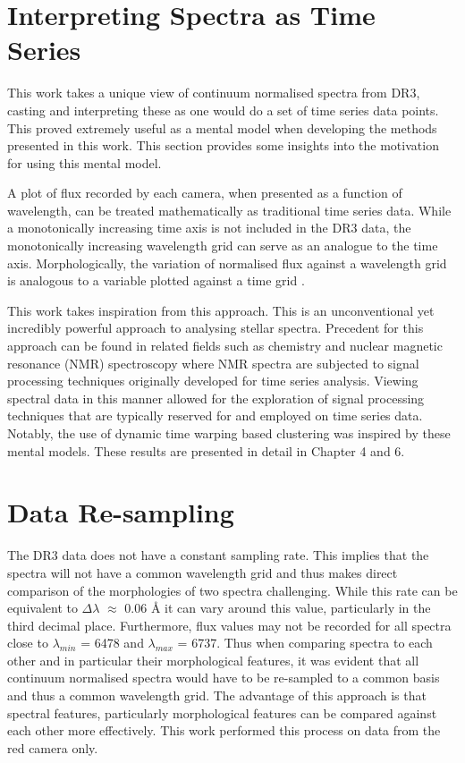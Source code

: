 \section{Interpreting Spectra as Time Series}

This work takes a unique view of continuum normalised spectra from DR3, casting and interpreting these as one would do a set of time series data points. This proved extremely useful as a mental model when developing the methods presented in this work. This section provides some insights into the motivation for using this mental model. 

A plot of flux recorded by each camera, when presented as a function of wavelength, can be treated mathematically as traditional time series data. While a monotonically increasing time axis is not included in the DR3 data, the monotonically increasing wavelength grid can serve as an analogue to the time axis. Morphologically, the variation of normalised flux against a wavelength grid is analogous to a variable plotted against a time grid \cite{nielsen2019practical}.

This work takes inspiration from this approach. This is an unconventional yet incredibly powerful approach to analysing stellar spectra. Precedent for this approach can be found in related fields such as chemistry and nuclear magnetic resonance (NMR) spectroscopy where NMR spectra are subjected to signal processing techniques originally developed for time series analysis\cite{nielsen2019practical}. Viewing spectral data in this manner allowed for the exploration of signal processing techniques that are typically reserved for and employed on time series data. Notably, the use of dynamic time warping based clustering was inspired by these mental models. These results are presented in detail in Chapter 4 and 6.

\section{Data Re-sampling}

The DR3 data does not have a constant sampling rate. This implies that the spectra will not have a common wavelength grid and thus makes direct comparison of the morphologies of two spectra challenging. While this rate can be equivalent to $\Delta\lambda$ $\approx$ 0.06 \r{A}\cite{vcotar2021galah} it can vary around this value, particularly in the third decimal place. Furthermore, flux values may not be recorded for all spectra close to $\lambda_{min}$ = 6478 and $\lambda_{max}$ = 6737. Thus when comparing spectra to each other and in particular their morphological features, it was evident that all continuum normalised spectra would have to be re-sampled to a common basis and thus a common wavelength grid. The advantage of this approach is that spectral features, particularly morphological features can be compared against each other more effectively. This work performed this process on data from the red camera only. 

